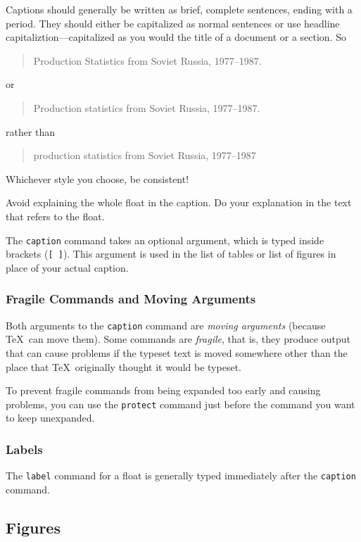 \documentclass{icmmcm}
\newcommand{\bslash}{\symbol{'134}}%
\newcommand{\bsl}{{\texttt{\bslash}}}
\newcommand{\com}[1]{\bsl\texttt{#1}\xspace}
\begin{document}
{Captions should generally be written as brief, complete sentences,
ending with a period.  They should either be capitalized as normal
sentences or use headline capitaliztion---capitalized as you would the
title of a document or a section.  So
\begin{quote}
  Production Statistics from Soviet Russia, 1977--1987.
\end{quote}
or
\begin{quote}
  Production statistics from Soviet Russia, 1977--1987.
\end{quote}
rather than
\begin{quote}
  production statistics from Soviet Russia, 1977--1987
\end{quote}
Whichever style you choose, be consistent!

Avoid explaining the whole float in the caption.  Do your explanation
in the text that refers to the float.  

The \com{caption} command takes an optional argument, which is typed
inside brackets (\verb|[ ]|).  This argument is used in the list of
tables or list of figures in place of your actual caption.


\subsubsection{Fragile Commands and Moving Arguments}%
\label{sec:fragile-commands}

Both arguments to the \com{caption} command are \emph{moving
  arguments} (because \TeX\ can move them).  Some commands are
\emph{fragile}, that is, they produce output that can cause problems
if the typeset text is moved somewhere other than the place that \TeX\ 
originally thought it would be typeset.
  
  To prevent fragile commands from being expanded too early and
  causing problems, you can use the \com{protect} command just before
  the command you want to keep unexpanded.


\subsubsection{Labels}%
\label{sec:labeling-floats}

The \com{label} command for a float is generally typed immediately
after the \com{caption} command.


\subsection{Figures}

}
\end{document}
